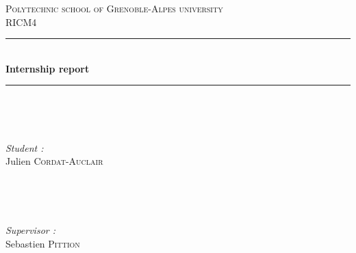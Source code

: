 \documentclass[12pt]{article}
\begin{document}
\begin{titlepage}

\newcommand{\HRule}{\rule{\linewidth}{0.2mm}} %

\center %
 

\textsc{\LARGE Polytechnic school of Grenoble-Alpes university}\\[1.0cm] %
\textsc{\Large RICM4}\\[1.5cm] %


\HRule \\[0.5cm]
{ \huge \bfseries Internship report}\\[0.2cm] %
\HRule \\[1.5cm]
 

\begin{minipage}{0.47\textwidth}
\begin{flushleft} \large

\

\emph{Student :}\\
Julien \textsc{Cordat-Auclair} %
\end{flushleft}
\end{minipage}
~
\begin{minipage}{0.47\textwidth}
\begin{flushright} \large

\

\emph{Supervisor :}\\
Sebastien \textsc{Pittion} %
\end{flushright}
\end{minipage}\\[3cm]



\end{titlepage}
\end{document}
